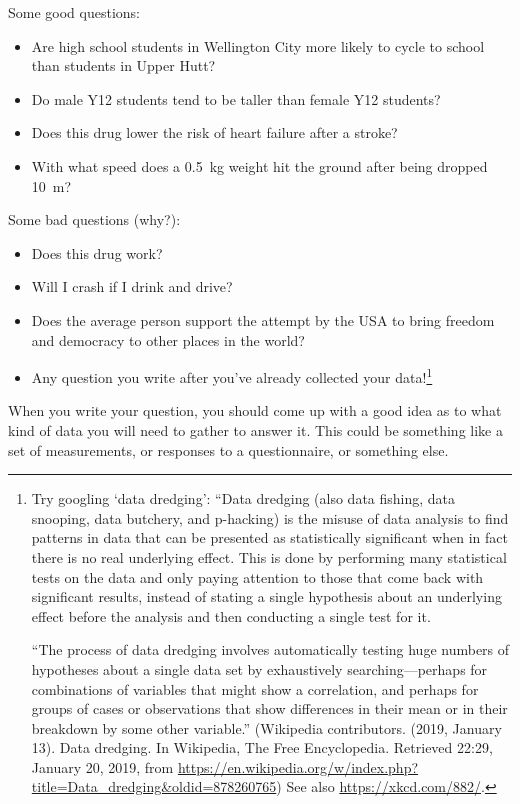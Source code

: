 Some good questions:
\begin{itemize}
  \item Are high school students in Wellington City more likely to cycle to school than students in Upper Hutt?
  \item Do male Y12 students tend to be taller than female Y12 students?
  \item Does this drug lower the risk of heart failure after a stroke?
  \item With what speed does a \SI{0.5}{\kilo\gram} weight hit the ground after being dropped \SI{10}{\metre}?
\end{itemize}

Some bad questions (why?):
\begin{itemize}
  \item Does this drug work?
  \item Will I crash if I drink and drive?
  \item Does the average person support the attempt by the USA to bring freedom and democracy to other places in the world?
  \item Any question you write after you've already collected your data!\footnote{Try googling `data dredging': ``Data dredging (also data fishing, data snooping,
        data butchery, and p-hacking) is the misuse of data analysis to find patterns in data that can be presented as statistically significant when in fact there
        is no real underlying effect. This is done by performing many statistical tests on the data and only paying attention to those that come back with
        significant results, instead of stating a single hypothesis about an underlying effect before the analysis and then conducting a single test for it.

        ``The process of data dredging involves automatically testing huge numbers of hypotheses about a single data set by exhaustively searching—perhaps for
        combinations of variables that might show a correlation, and perhaps for groups of cases or observations that show differences in their mean or in
        their breakdown by some other variable.'' (Wikipedia contributors. (2019, January 13). Data dredging. In Wikipedia, The Free Encyclopedia. Retrieved 22:29, January 20, 2019, from \url{https://en.wikipedia.org/w/index.php?title=Data_dredging&oldid=878260765}) See also \url{https://xkcd.com/882/}.}
\end{itemize}

When you write your question, you should come up with a good idea as to what kind of data you will need to gather to answer it. This could
be something like a set of measurements, or responses to a questionnaire, or something else.

